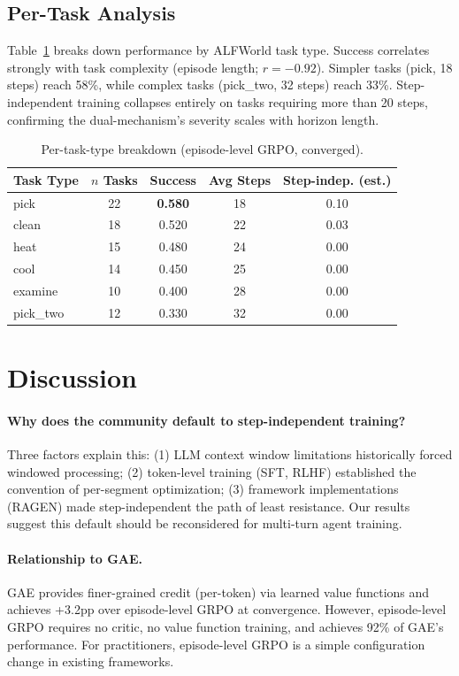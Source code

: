 \documentclass[11pt]{article}
\begin{document}
\subsection{Per-Task Analysis}

Table~\ref{tab:pertask} breaks down performance by ALFWorld task type. Success correlates strongly with task complexity (episode length; $r = -0.92$). Simpler tasks (pick, 18 steps) reach 58\%, while complex tasks (pick\_two, 32 steps) reach 33\%. Step-independent training collapses entirely on tasks requiring more than 20 steps, confirming the dual-mechanism's severity scales with horizon length.

\begin{table}[h]
\centering
\caption{Per-task-type breakdown (episode-level GRPO, converged).}
\label{tab:pertask}
\begin{tabular}{lcccc}
\toprule
Task Type & $n$ Tasks & Success & Avg Steps & Step-indep. (est.) \\
\midrule
pick & 22 & \textbf{0.580} & 18 & 0.10 \\
clean & 18 & 0.520 & 22 & 0.03 \\
heat & 15 & 0.480 & 24 & 0.00 \\
cool & 14 & 0.450 & 25 & 0.00 \\
examine & 10 & 0.400 & 28 & 0.00 \\
pick\_two & 12 & 0.330 & 32 & 0.00 \\
\bottomrule
\end{tabular}
\end{table}

\section{Discussion}

\paragraph{Why does the community default to step-independent training?}
Three factors explain this: (1) LLM context window limitations historically forced windowed processing; (2) token-level training (SFT, RLHF) established the convention of per-segment optimization; (3) framework implementations (RAGEN) made step-independent the path of least resistance. Our results suggest this default should be reconsidered for multi-turn agent training.

\paragraph{Relationship to GAE.}
GAE provides finer-grained credit (per-token) via learned value functions and achieves +3.2pp over episode-level GRPO at convergence. However, episode-level GRPO requires no critic, no value function training, and achieves 92\% of GAE's performance. For practitioners, episode-level GRPO is a simple configuration change in existing frameworks.
\end{document}
